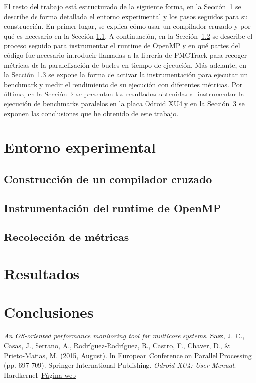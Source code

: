 El resto del trabajo está estructurado de la siguiente forma, en la Sección~\ref{sec:expent} se describe de forma detallada el entorno experimental y los pasos seguidos para su construcción. En primer lugar, se explica cómo usar un compilador cruzado y por qué es necesario en la Sección \ref{sec:crucomp}. A continuación, en la Sección~\ref{sec:instrum} se describe el proceso seguido para instrumentar el runtime de OpenMP y en qué partes del código fue necesario introducir llamadas a la librería de PMCTrack para recoger métricas de la paralelización de bucles en tiempo de ejecución. Más adelante, en la Sección~\ref{sec:recolecc} se expone la forma de activar la instrumentación para ejecutar un benchmark y medir el rendimiento de su ejecución con diferentes métricas. Por último, en la Sección~\ref{sec:results} se presentan los resultados obtenidos al instrumentar la ejecución de benchmarks paralelos en la placa Odroid XU4 y en la Sección~\ref{sec:conclu} se exponen las conclusiones que he obtenido de este trabajo.

\section{Entorno experimental}\label{sec:expent}

\subsection{Construcción de un compilador cruzado}\label{sec:crucomp}

\subsection{Instrumentación del runtime de OpenMP}\label{sec:instrum}

\subsection{Recolección de métricas}\label{sec:recolecc}

\section{Resultados}\label{sec:results}

\section{Conclusiones}\label{sec:conclu}


\begin{thebibliography}{1}
\textit{An OS-oriented performance monitoring tool for multicore systems}. Saez, J. C., Casas, J., Serrano, A., Rodríguez-Rodríguez, R., Castro, F., Chaver, D., \& Prieto-Matias, M. (2015, August). In European Conference on Parallel Processing (pp. 697-709). Springer International Publishing.
 \textit{Odroid XU4: User Manual}. Hardkernel. \href{http://magazine.odroid.com/odroid-xu4/}{Página web}

\end{thebibliography}

